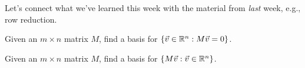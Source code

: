 \documentclass{homework}
\begin{document}
Let's connect what we've learned this week with the material from
\textit{last} week, e.g., row reduction.

\begin{problem}
  Given an $m \times n$ matrix $M$, find a basis for
  $\{ \vec{v} \in \mathbb{R}^n : M \vec{v} = 0 \}$.
\end{problem}

\vfill

\begin{problem}
  Given an $m \times n$ matrix $M$, find a basis for
  $\{ M \vec{v} : \vec{v} \in \mathbb{R}^n \}$.
\end{problem}

\vfill
\end{document}
